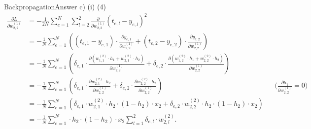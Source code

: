 \documentclass[t]{beamer}
\begin{document}
\begin{frame}{Backpropagation}{Answer c) (i) (4)}
    {\small
        \begin{align*}
            \frac{\partial L}{\partial w_{2,2}^{(1)}} & = - \frac{1}{2N} \sum_{e=1}^N \sum_{l=2}^2 \frac{\partial}{\partial w_{2,2}^{(1)}} \left(t_{e,l}-y_{e,l}\right)^2                                                                                                                                                                                                                      \\
                                                      & = - \frac{1}{N} \sum_{e=1}^{N} \left( (t_{e,1}-y_{e,1})\cdot \frac{\partial y_{e,1}}{\partial w_{2,2}^{(1)}} + (t_{e,2}-y_{e,2}) \cdot \frac{\partial y_{e,2}}{\partial w_{2,2}^{(1)}}  \right)                                                                                                                                        \\
                                                      & = - \frac{1}{N} \sum_{e=1}^{N} \left( \delta_{e,1}\cdot\frac{\partial(w^{(2)}_{1,1}\cdot h_1 + w^{(2)}_{2,1}\cdot h_2)}{\partial w_{2,2}^{(1)}} + \delta_{e,2}\cdot\frac{\partial(w^{(2)}_{1,2}\cdot h_1 + w^{(2)}_{2,2}\cdot h_2)}{\partial w_{2,2}^{(1)}}  \right)                                                                   \\
                                                      & = - \frac{1}{N} \sum_{e=1}^{N} \left( \delta_{e,1}\cdot\frac{\partial w^{(2)}_{2,1}\cdot h_2}{\partial w_{2,2}^{(1)}} + \delta_{e,2}\cdot\frac{\partial w^{(2)}_{2,2}\cdot h_2}{\partial w_{2,2}^{(1)}}  \right)                                                     &  & \text{($\frac{\partial h_{1}}{\partial w_{2,2}^{(1)}} = 0$)} \\
                                                      & = - \frac{1}{N} \sum_{e=1}^{N} \left( \delta_{e,1}\cdot w^{(2)}_{2,1} \cdot h_2\cdot(1 - h_2)\cdot x_2 + \delta_{e,2}\cdot w^{(2)}_{2,2}\cdot h_2\cdot(1 - h_2)\cdot x_2  \right)                                                                                                                                                      \\
                                                      & = - \frac{1}{N} \sum_{e=1}^{N} \cdot h_2\cdot(1 - h_2)\cdot x_2 \sum_{l=1}^{2} \delta_{e,l}\cdot w^{(2)}_{2,l}.                                                                                                                                                                                                                        \\
        \end{align*}
    }
\end{frame}
\end{document}
